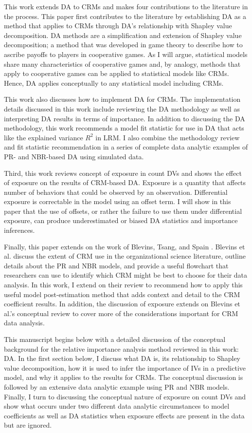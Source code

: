 \documentclass[ShortAfour,times,sageapa]{sagej}
\begin{document}
	This work extends DA to CRMs and makes four contributions to the literature in the process.
	This paper first contributes to the literature by establishing DA as a method that applies to CRMs through DA's relationship with Shapley value decomposition.
	DA methods are a simplification and extension of Shapley value decomposition; a method that was developed in game theory to describe how to ascribe payoffs to players in cooperative games.
	As I will argue, statistical models share many characteristics of cooperative games and, by analogy, methods that apply to cooperative games can be applied to statistical models like CRMs.
	Hence, DA applies conceptually to any statistical model including CRMs.
	
	This work also discusses how to implement DA for CRMs.
	The implementation details discussed in this work include reviewing the DA methodology as well as interpreting DA results in terms of importance.
	In addition to discussing the DA methodology, this work recommends a model fit statistic for use in DA that acts like the explained variance $R^2$ in LRM.
	I also combine the methodology review and fit statistic recommendation in a series of complete data analytic examples of PR- and NBR-based DA using simulated data.
	
	Third, this work reviews concept of exposure in count DVs and shows the effect of exposure on the results of CRM-based DA. 
	Exposure is a quantity that affects number of behaviors that could be observed by an observation.
	Differential exposure is correctable in the model using an offset term.
	I will show in this paper that the use of offsets, or rather the failure to use them under differential exposure, can produce underestimated or biased DA statistics and importance inferences.
	
	Finally, this paper extends on the work of Blevins, Tsang, and Spain \citeyear{blevins2015count}. 
	Blevins et al. discuss the extent of CRM use in the organizational science literature, outline details about the PR and NBR models, and provide a useful flowchart that researchers can use to identify which CRM might be best to choose for their data analysis.
	In this work, I extend on their review to recommend how to apply this useful model post-estimation method that adds context and detail to the CRM coefficient results.
	In addition, the discussion of exposure extends on Blevins et al.'s conceptual review to cover more of the considerations important for CRM data analysis.
	
	This manuscript begins below with a detailed discussion of the conceptual background for the relative importance analysis method reviewed in this work: DA.
	In the first section below, I discuss what DA is, its relationship to Shapley value decomposition, how it is used to infer the importance of IVs in a predictive model, and why it applies to the results for CRMs.
	The conceptual discussion is followed by an extensive data analytic example using PR and NBR models.
	Finally, I turn to discussing the conceptual nature of exposure on count DVs and show what occurs under two different data analytic circumstances to model coefficients as well as DA statistics when exposure effects are present in the data but are ignored.
		
\end{document}
